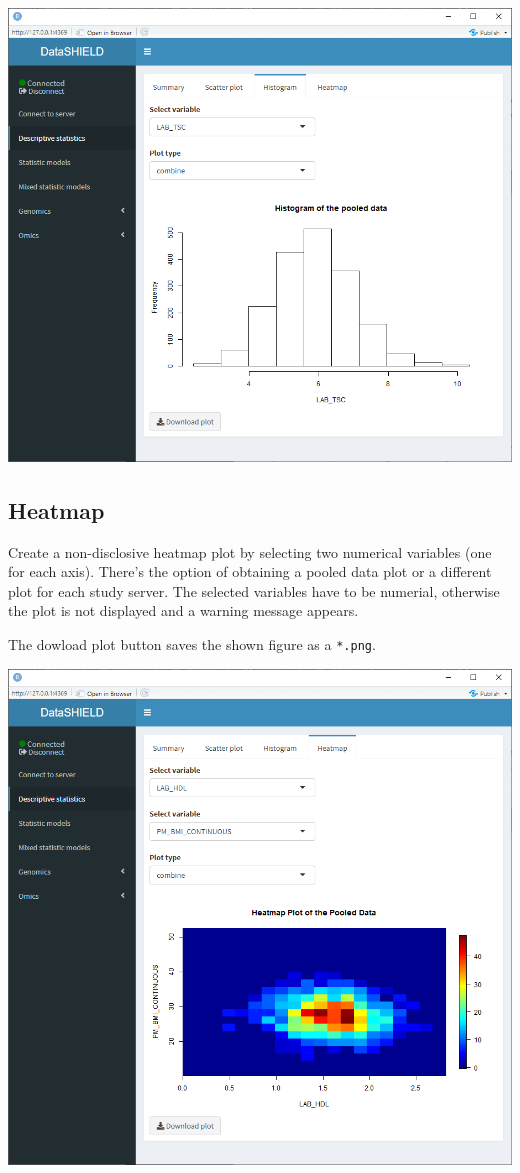 \documentclass[
]{book}
\begin{document}
\includegraphics{images/descriptive_stats4.png}

\hypertarget{heatmap}{%
\subsection{Heatmap}\label{heatmap}}

Create a non-disclosive heatmap plot by selecting two numerical variables (one for each axis). There's the option of obtaining a pooled data plot or a different plot for each study server. The selected variables have to be numerial, otherwise the plot is not displayed and a warning message appears.

The dowload plot button saves the shown figure as a \texttt{*.png}.

\includegraphics{images/descriptive_stats5.png}
\end{document}
